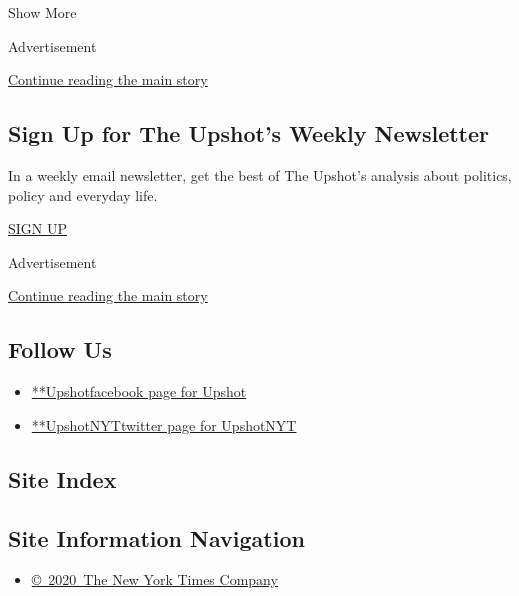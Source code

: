 Show More

Advertisement

\protect\hyperlink{after-mid2}{Continue reading the main story}

\hypertarget{sign-up-for-the-upshots-weekly-newsletter}{%
\subsection{Sign Up for The Upshot's Weekly
Newsletter}\label{sign-up-for-the-upshots-weekly-newsletter}}

In a weekly email newsletter, get the best of The Upshot's analysis
about politics, policy and everyday life.

\href{/newsletters/signup/UP}{SIGN UP}

Advertisement

\protect\hyperlink{after-mktg}{Continue reading the main story}

\hypertarget{follow-us}{%
\subsection{Follow Us}\label{follow-us}}

\begin{itemize}
\tightlist
\item
  \href{https://www.facebookcorewwwi.onion/Upshot}{**Upshotfacebook page
  for Upshot}
\item
  \href{https://twitter.com/UpshotNYT}{**UpshotNYTtwitter page for
  UpshotNYT}
\end{itemize}

\hypertarget{site-index}{%
\subsection{Site Index}\label{site-index}}

\hypertarget{site-information-navigation}{%
\subsection{Site Information
Navigation}\label{site-information-navigation}}

\begin{itemize}
\tightlist
\item
  \href{https://help.nytimes3xbfgragh.onion/hc/en-us/articles/115014792127-Copyright-notice}{©~2020~The
  New York Times Company}
\end{itemize}

